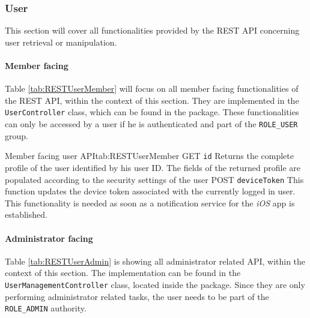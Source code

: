 \subsubsection{User}
This section will cover all functionalities provided by the \gls{REST} \gls{API} concerning user retrieval or manipulation.

\paragraph{Member facing}

Table \vref{tab:RESTUserMember} will focus on all member facing functionalities of the \gls{REST} \gls{API}, within the context of this section. They are implemented in the \texttt{UserController} class, which can be found in the  package. These functionalities can only be accessed by a user if he is authenticated and part of the \texttt{ROLE\_USER} group.

\begin{RESTTable}{Member facing user API}{tab:RESTUserMember}
		{GET}
		{\texttt{id}}
		{Returns the complete profile of the user identified by his user ID. The fields of the returned profile are populated according to the security settings of the user}
		{POST}
		{\texttt{deviceToken}}
		{This function updates the device token associated with the currently logged in user. This functionality is needed as soon as a notification service for the \emph{iOS} app is established. }
\end{RESTTable}

\paragraph{Administrator facing}

Table \vref{tab:RESTUserAdmin} is showing all administrator related \gls{API}, within the context of this section. The implementation can be found in the \texttt{UserManagementController} class, located inside the  package. Since they are only performing administrator related tasks, the user needs to be part of the \texttt{ROLE\_ADMIN} authority.

